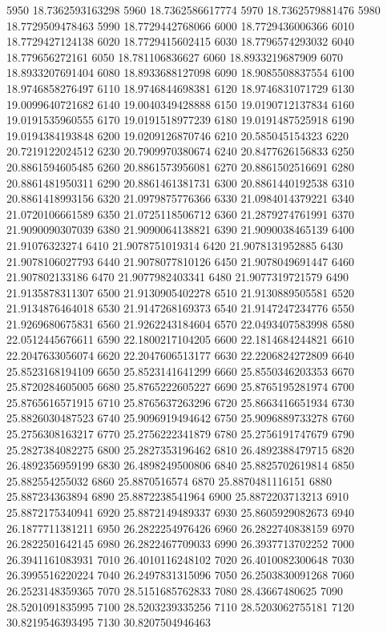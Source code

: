 {5950 18.7362593163298
5960 18.7362586617774
5970 18.7362579881476
5980 18.7729509478463
5990 18.7729442768066
6000 18.7729436006366
6010 18.7729427124138
6020 18.7729415602415
6030 18.7796574293032
6040 18.779656272161
6050 18.781106836627
6060 18.8933219687909
6070 18.8933207691404
6080 18.8933688127098
6090 18.9085508837554
6100 18.9746858276497
6110 18.9746844698381
6120 18.9746831071729
6130 19.0099640721682
6140 19.0040349428888
6150 19.0190712137834
6160 19.0191535960555
6170 19.0191518977239
6180 19.0191487525918
6190 19.0194384193848
6200 19.0209126870746
6210 20.585045154323
6220 20.7219122024512
6230 20.7909970380674
6240 20.8477626156833
6250 20.8861594605485
6260 20.8861573956081
6270 20.8861502516691
6280 20.8861481950311
6290 20.8861461381731
6300 20.8861440192538
6310 20.8861418993156
6320 21.0979875776366
6330 21.0984014379221
6340 21.0720106661589
6350 21.0725118506712
6360 21.2879274761991
6370 21.9090090307039
6380 21.9090064138821
6390 21.9090038465139
6400 21.91076323274
6410 21.9078751019314
6420 21.9078131952885
6430 21.9078106027793
6440 21.9078077810126
6450 21.9078049691447
6460 21.907802133186
6470 21.9077982403341
6480 21.9077319721579
6490 21.9135878311307
6500 21.9130905402278
6510 21.9130889505581
6520 21.9134876464018
6530 21.9147268169373
6540 21.9147247234776
6550 21.9269680675831
6560 21.9262243184604
6570 22.0493407583998
6580 22.0512445676611
6590 22.1800217104205
6600 22.1814684244821
6610 22.2047633056074
6620 22.2047606513177
6630 22.2206824272809
6640 25.8523168194109
6650 25.8523141641299
6660 25.8550346203353
6670 25.8720284605005
6680 25.8765222605227
6690 25.8765195281974
6700 25.8765616571915
6710 25.8765637263296
6720 25.8663416651934
6730 25.8826030487523
6740 25.9096919494642
6750 25.9096889733278
6760 25.2756308163217
6770 25.2756222341879
6780 25.2756191747679
6790 25.2827384082275
6800 25.2827353196462
6810 26.4892388479715
6820 26.4892356959199
6830 26.4898249500806
6840 25.8825702619814
6850 25.882554255032
6860 25.8870516574
6870 25.8870481116151
6880 25.887234363894
6890 25.8872238541964
6900 25.8872203713213
6910 25.8872175340941
6920 25.8872149489337
6930 25.8605929082673
6940 26.1877711381211
6950 26.2822254976426
6960 26.2822740838159
6970 26.2822501642145
6980 26.2822467709033
6990 26.3937713702252
7000 26.3941161083931
7010 26.4010116248102
7020 26.4010082300648
7030 26.3995516220224
7040 26.2497831315096
7050 26.2503830091268
7060 26.2523148359365
7070 28.5151685762833
7080 28.43667480625
7090 28.5201091835995
7100 28.5203239335256
7110 28.5203062755181
7120 30.8219546393495
7130 30.8207504946463
}
